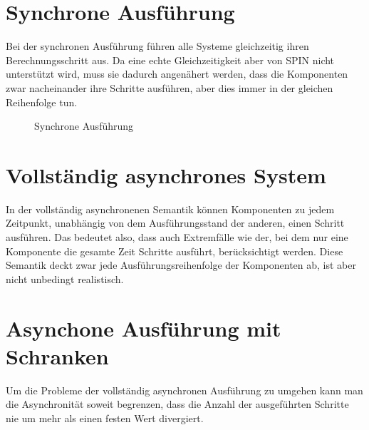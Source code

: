 \section{Synchrone Ausführung}
Bei der synchronen Ausführung führen alle Systeme gleichzeitig ihren Berechnungsschritt aus.
Da eine echte Gleichzeitigkeit aber von SPIN nicht unterstützt wird, muss sie dadurch angenähert werden, dass die Komponenten zwar nacheinander ihre Schritte ausführen, aber dies  immer in der gleichen Reihenfolge tun.

\begin{figure}[h]
  \centering
  \caption{Synchrone Ausführung}
\end{figure}
\section{Vollständig asynchrones System}
In der vollständig asynchronenen Semantik können Komponenten zu jedem Zeitpunkt, unabhängig von dem Ausführungsstand der anderen, einen Schritt ausführen.
Das bedeutet also, dass auch Extremfälle wie der, bei dem nur eine Komponente die gesamte Zeit Schritte ausführt, berücksichtigt werden.
Diese Semantik deckt zwar jede Ausführungsreihenfolge der Komponenten ab, ist aber nicht unbedingt realistisch.
\section{Asynchone Ausführung mit Schranken}
Um die Probleme der vollständig asynchronen Ausführung zu umgehen kann man die Asynchronität soweit begrenzen, dass die Anzahl der ausgeführten Schritte nie um mehr als einen festen Wert divergiert.
